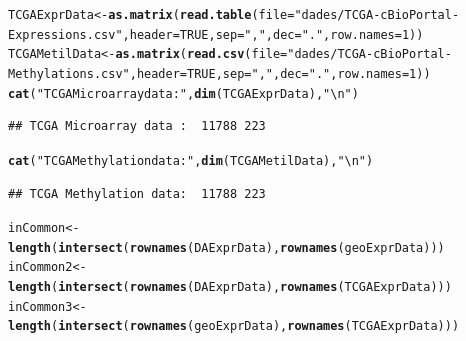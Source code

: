 \documentclass[a4paper,10pt]{article}\usepackage[]{graphicx}\usepackage[]{color}
\makeatletter
\newcommand{\hlnum}[1]{\textcolor[rgb]{0.686,0.059,0.569}{#1}}%
\newcommand{\hlstr}[1]{\textcolor[rgb]{0.192,0.494,0.8}{#1}}%
\newcommand{\hlstd}[1]{\textcolor[rgb]{0.345,0.345,0.345}{#1}}%
\newcommand{\hlkwb}[1]{\textcolor[rgb]{0.69,0.353,0.396}{#1}}%
\newcommand{\hlkwc}[1]{\textcolor[rgb]{0.333,0.667,0.333}{#1}}%
\newcommand{\hlkwd}[1]{\textcolor[rgb]{0.737,0.353,0.396}{\textbf{#1}}}%
\newenvironment{kframe}{%
 \def\at@end@of@kframe{}%
 \ifinner\ifhmode%
  \def\at@end@of@kframe{\end{minipage}}%
  \begin{minipage}{\columnwidth}%
 \fi\fi%
 \def\FrameCommand##1{\hskip\@totalleftmargin \hskip-\fboxsep
 \colorbox{shadecolor}{##1}\hskip-\fboxsep
     \hskip-\linewidth \hskip-\@totalleftmargin \hskip\columnwidth}%
 \MakeFramed {\advance\hsize-\width
   \@totalleftmargin\z@ \linewidth\hsize
   \@setminipage}}%
 {\par\unskip\endMakeFramed%
 \at@end@of@kframe}
\newenvironment{knitrout}{}{} %
\makeatother
\begin{document}
\begin{itemize}
\begin{knitrout}
\color{fgcolor}\begin{kframe}
\begin{alltt}
\hlstd{TCGAExprData} \hlkwb{<-}  \hlkwd{as.matrix}\hlstd{(}\hlkwd{read.table}\hlstd{(}\hlkwc{file}\hlstd{=}\hlstr{"dades/TCGA-cBioPortal-Expressions.csv"}\hlstd{,} \hlkwc{header}\hlstd{=}\hlnum{TRUE}\hlstd{,} \hlkwc{sep}\hlstd{=}\hlstr{","}\hlstd{,} \hlkwc{dec}\hlstd{=}\hlstr{"."}\hlstd{,} \hlkwc{row.names}\hlstd{=}\hlnum{1}\hlstd{))}
\hlstd{TCGAMetilData} \hlkwb{<-}  \hlkwd{as.matrix}\hlstd{(}\hlkwd{read.csv}\hlstd{(}\hlkwc{file}\hlstd{=}\hlstr{"dades/TCGA-cBioPortal-Methylations.csv"}\hlstd{,} \hlkwc{header}\hlstd{=}\hlnum{TRUE}\hlstd{,} \hlkwc{sep}\hlstd{=}\hlstr{","}\hlstd{,} \hlkwc{dec}\hlstd{=}\hlstr{"."}\hlstd{,} \hlkwc{row.names}\hlstd{=}\hlnum{1}\hlstd{))}
\hlkwd{cat}\hlstd{(}\hlstr{"TCGA Microarray data : "}\hlstd{,} \hlkwd{dim}\hlstd{(TCGAExprData),} \hlstr{"\textbackslash{}n"}\hlstd{)}
\end{alltt}
\begin{verbatim}
## TCGA Microarray data :  11788 223
\end{verbatim}
\begin{alltt}
\hlkwd{cat}\hlstd{(}\hlstr{"TCGA Methylation data: "}\hlstd{,} \hlkwd{dim}\hlstd{(TCGAMetilData),} \hlstr{"\textbackslash{}n"}\hlstd{)}
\end{alltt}
\begin{verbatim}
## TCGA Methylation data:  11788 223
\end{verbatim}
\end{kframe}
\end{knitrout}
\end{itemize}

\begin{knitrout}
\color{fgcolor}\begin{kframe}
\begin{alltt}
\hlstd{inCommon}\hlkwb{<-} \hlkwd{length}\hlstd{(}\hlkwd{intersect}\hlstd{(}\hlkwd{rownames}\hlstd{(DAExprData),} \hlkwd{rownames}\hlstd{(geoExprData)))}
\hlstd{inCommon2} \hlkwb{<-} \hlkwd{length}\hlstd{(}\hlkwd{intersect}\hlstd{(}\hlkwd{rownames}\hlstd{(DAExprData),} \hlkwd{rownames}\hlstd{(TCGAExprData)))}
\hlstd{inCommon3} \hlkwb{<-} \hlkwd{length}\hlstd{(}\hlkwd{intersect}\hlstd{(}\hlkwd{rownames}\hlstd{(geoExprData),} \hlkwd{rownames}\hlstd{(TCGAExprData)))}
\end{alltt}
\end{kframe}
\end{knitrout}
\end{document}
